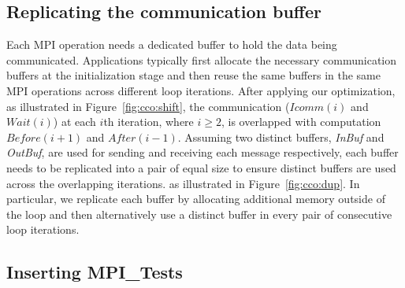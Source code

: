 \subsection{Replicating the communication buffer}
Each MPI operation needs a dedicated buffer to hold the data being communicated.
Applications typically first allocate the necessary communication buffers at the initialization stage and then reuse
the same buffers in the same MPI operations across different loop iterations.
After applying our optimization, as illustrated in Figure~\ref{fig:cco:shift},
  the communication ($Icomm(i)$ and $Wait(i)$) at each $i$th iteration, where $i \geq 2$,  is overlapped with computation $Before(i+1)$ and $After(i-1)$.
  Assuming two distinct buffers, {\em InBuf} and {\em OutBuf}, are used for sending and receiving each message respectively, 
 each buffer needs to be replicated into a pair of equal size to ensure distinct buffers are used across the overlapping iterations. 
as illustrated in Figure~\ref{fig:cco:dup}.
In particular, we replicate each buffer
  by allocating additional memory outside of the loop %
  and then alternatively use a distinct buffer in every pair of consecutive loop iterations.

\subsection{Inserting MPI\_Tests}
%
%
%

